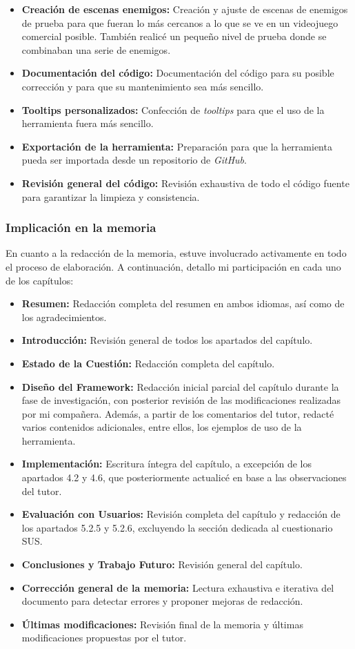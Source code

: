 \begin{itemize}
	\item \textbf{Creación de escenas enemigos:} Creación y ajuste de escenas de enemigos de prueba para que fueran lo más cercanos a lo que se ve en un videojuego comercial posible. También realicé un pequeño nivel de prueba donde se combinaban una serie de enemigos.
	\item \textbf{Documentación del código:} Documentación del código para su posible corrección y para que su mantenimiento sea más sencillo.
	\item \textbf{Tooltips personalizados:} Confección de \textit{tooltips} para que el uso de la herramienta fuera más sencillo.
	\item \textbf{Exportación de la herramienta:} Preparación para que la herramienta pueda ser importada desde un repositorio de \textit{GitHub}.
  	\item \textbf{Revisión general del código:} Revisión exhaustiva de todo el código fuente para garantizar la limpieza y consistencia.
\end{itemize}
\subsubsection{Implicación en la memoria}
En cuanto a la redacción de la memoria, estuve involucrado activamente en todo el proceso de elaboración. A continuación, detallo mi participación en cada uno de los capítulos:

\begin{itemize}
 	\item \textbf{Resumen:} Redacción completa del resumen en ambos idiomas, así como de los agradecimientos.
 	\item \textbf{Introducción:} Revisión general de todos los apartados del capítulo.
 	\item \textbf{Estado de la Cuestión:} Redacción completa del capítulo.
 	\item \textbf{Diseño del Framework:} Redacción inicial parcial del capítulo durante la fase de investigación, con posterior revisión de las modificaciones realizadas por mi compañera. Además, a partir de los comentarios del tutor, redacté varios contenidos adicionales, entre ellos, los ejemplos de uso de la herramienta.
 	\item \textbf{Implementación:} Escritura íntegra del capítulo, a excepción de los apartados 4.2 y 4.6, que posteriormente actualicé en base a las observaciones del tutor.
 	\item \textbf{Evaluación con Usuarios:} Revisión completa del capítulo y redacción de los apartados 5.2.5 y 5.2.6, excluyendo la sección dedicada al cuestionario SUS.
 	\item \textbf{Conclusiones y Trabajo Futuro:} Revisión general del capítulo.
 	\item \textbf{Corrección general de la memoria:} Lectura exhaustiva e iterativa del documento para detectar errores y proponer mejoras de redacción.
	\item \textbf{Últimas modificaciones:} Revisión final de la memoria y últimas modificaciones propuestas por el tutor.
\end{itemize}
